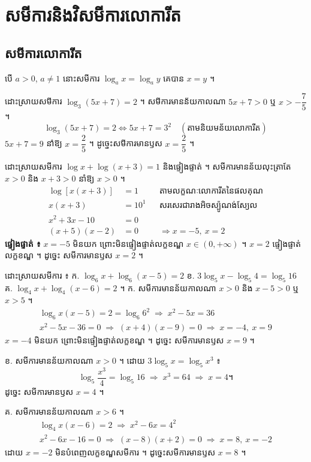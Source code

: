 \section{សមីការនិងវិសមីការលោការីត}
\subsection{សមីការលោការីត}
បើ $a > 0$, $a \ne 1$ នោះសមីការ $\log_a x = \log_a y$ គេបាន $x = y$ ។

\begin{example}[ឧទាហរណ៍ ១]
ដោះស្រាយសមីការ $\log_3(5x + 7) = 2$ ។
\ans
សមីការមានន័យកាលណា $5x + 7 > 0$ ឬ $x > -\dfrac{7}{5}$ ។
\[
\log_3(5x + 7) = 2 \iff 5x + 7 = 3^2 \quad (\text{តាមនិយមន័យលោការីត})
\]
$5x + 7 = 9$ នាំឱ្យ $x = \dfrac{2}{5}$ ។ ដូច្នេះសមីការមានឫស $x = \dfrac{2}{5}$ ។
\end{example}

\begin{example}[ឧទាហរណ៍ ២]
ដោះស្រាយសមីការ $\log x + \log(x + 3) = 1$ និងផ្ទៀងផ្ទាត់ ។
\ans
សមីការមានន័យលុះត្រាតែ $x > 0$ និង $x + 3 > 0$ នាំឱ្យ $x > 0$ ។
\[
\begin{aligned}
\log[x(x + 3)] &= 1 && \text{តាមលក្ខណៈលោការីតនៃផលគុណ}\\
x(x + 3) &= 10^1 && \text{សរសេរជារាងអិចស្ប៉ូណង់ស្យែល}\\
x^2 + 3x - 10 &= 0\\
(x + 5)(x - 2) &= 0 && \Rightarrow x = -5,\ x = 2
\end{aligned}
\]
\textbf{ផ្ទៀងផ្ទាត់ ៖} $x = -5$ មិនយក ព្រោះមិនផ្ទៀងផ្ទាត់លក្ខខណ្ឌ $x \in (0, +\infty)$ ។ $x = 2$ ផ្ទៀងផ្ទាត់លក្ខខណ្ឌ ។ ដូច្នេះ សមីការមានឫស $x = 2$ ។
\end{example}

\begin{example}[លំហាត់គំរូ]
ដោះស្រាយសមីការ ៖ \quad ក. $\log_6 x + \log_6(x - 5) = 2$ \quad ខ. $3\log_5 x - \log_5 4 = \log_5 16$ \quad គ. $\log_4 x + \log_4(x - 6) = 2$ ។
\ans
ក. សមីការមានន័យកាលណា $x > 0$ និង $x - 5 > 0$ ឬ $x > 5$ ។
\[
\begin{gathered}
\log_6 x(x - 5) = 2 = \log_6 6^2 \;\Rightarrow\; x^2 - 5x = 36\\
x^2 - 5x - 36 = 0 \;\Rightarrow\; (x + 4)(x - 9) = 0 \;\Rightarrow\; x = -4,\ x = 9
\end{gathered}
\]
$x = -4$ មិនយក ព្រោះមិនផ្ទៀងផ្ទាត់លក្ខខណ្ឌ ។ ដូច្នេះ សមីការមានឫស $x = 9$ ។

ខ. សមីការមានន័យកាលណា $x > 0$ ។ ដោយ $3\log_5 x = \log_5 x^3$ ៖
\[
\log_5\frac{x^3}{4} = \log_5 16 \;\Rightarrow\; x^3 = 64 \;\Rightarrow\; x = 4 ។
\]
ដូច្នេះ សមីការមានឫស $x = 4$ ។

គ. សមីការមានន័យកាលណា $x > 6$ ។
\[
\begin{gathered}
\log_4 x(x - 6) = 2 \;\Rightarrow\; x^2 - 6x = 4^2\\
x^2 - 6x - 16 = 0 \;\Rightarrow\; (x - 8)(x + 2) = 0 \;\Rightarrow\; x = 8,\ x = -2
\end{gathered}
\]
ដោយ $x = -2$ មិនបំពេញលក្ខខណ្ឌសមីការ ។ ដូច្នេះសមីការមានឫស $x = 8$ ។
\end{example}

